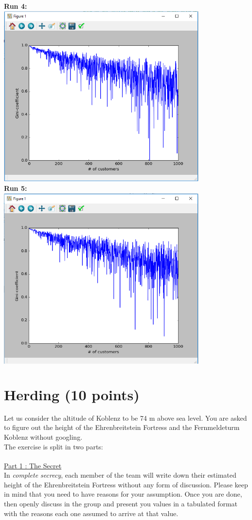 \documentclass{WeSTassignment}
\begin{document}
\textbf{Run 4:}\\
\includegraphics[width=400px]{4thPlot}\\
\textbf{Run 5:}\\
\includegraphics[width=400px]{5thPlot}\\




\section{Herding (10 points)}
Let us consider the altitude of Koblenz to be 74 m above sea level. You are asked to figure out the height of the Ehrenbreitstein Fortress and the Fernmeldeturm Koblenz without googling.\\
The exercise is split in two parts:\\ \\
\underline{Part 1 : The Secret}\\
In \textit{complete secrecy}, each member of the team will write down their estimated height of the Ehrenbreitstein Fortress without any form of discussion. Please keep in mind that you need to have reasons for your assumption. Once you are done, then openly discuss in the group and present you values in a tabulated format with the reasons each one assumed to arrive at that value. 
\end{document}
